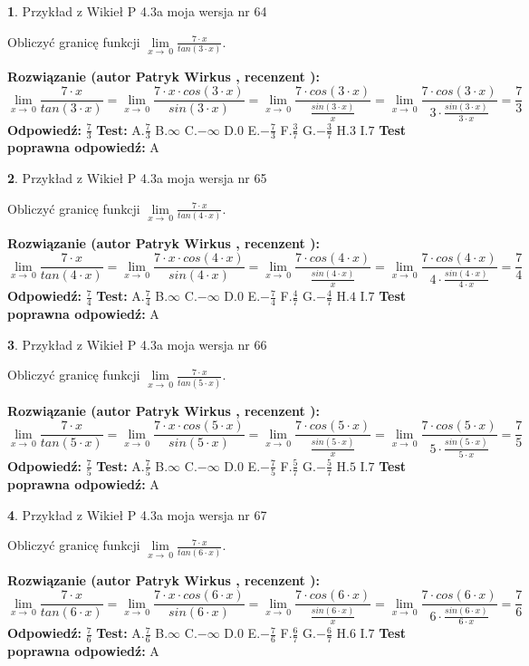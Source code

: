 \documentclass[12pt, a4paper]{article}
\theoremstyle{definition} %
\newtheorem{zad}{}
\newcommand{\zadStart}[1]{\begin{zad}#1\newline}
\newcommand{\zadStop}{\end{zad}}
\newcommand{\rozwStart}[2]{\noindent \textbf{Rozwiązanie (autor #1 , recenzent #2): }\newline}
\newcommand{\rozwStop}{\newline}
\newcommand{\odpStart}{\noindent \textbf{Odpowiedź:}\newline}
\newcommand{\odpStop}{\newline}
\newcommand{\testStart}{\noindent \textbf{Test:}\newline}
\newcommand{\testStop}{\newline}
\newcommand{\kluczStart}{\noindent \textbf{Test poprawna odpowiedź:}\newline}
\newcommand{\kluczStop}{\newline}
\begin{document}
\zadStart{Przykład z Wikieł P 4.3a moja wersja nr 64}


Obliczyć granicę funkcji $\lim\limits_{x\to\ 0}\frac{7 \cdot x}{tan(3 \cdot x)}$.
\zadStop
\rozwStart{Patryk Wirkus}{}
$$\lim\limits_{x\to\ 0}\frac{7 \cdot x}{tan(3 \cdot x)}=\lim\limits_{x\to\ 0}\frac{7 \cdot x \cdot cos(3 \cdot x)}{sin(3 \cdot x)}=\lim\limits_{x\to\ 0}\frac{7 \cdot cos(3 \cdot x)}{\frac{sin(3 \cdot x)}{x}}=\lim\limits_{x\to\ 0}\frac{7 \cdot cos(3 \cdot x)}{3 \cdot \frac{sin(3 \cdot x)}{3 \cdot x}} = \frac{7}{3}$$
\rozwStop
\odpStart
$\frac{7}{3}$
\odpStop
\testStart
A.$\frac{7}{3}$
B.$\infty$
C.$-\infty$
D.$0$
E.$-\frac{7}{3}$
F.$\frac{3}{7}$
G.$-\frac{3}{7}$
H.$3$
I.$7$
\testStop
\kluczStart
A
\kluczStop



\zadStart{Przykład z Wikieł P 4.3a moja wersja nr 65}


Obliczyć granicę funkcji $\lim\limits_{x\to\ 0}\frac{7 \cdot x}{tan(4 \cdot x)}$.
\zadStop
\rozwStart{Patryk Wirkus}{}
$$\lim\limits_{x\to\ 0}\frac{7 \cdot x}{tan(4 \cdot x)}=\lim\limits_{x\to\ 0}\frac{7 \cdot x \cdot cos(4 \cdot x)}{sin(4 \cdot x)}=\lim\limits_{x\to\ 0}\frac{7 \cdot cos(4 \cdot x)}{\frac{sin(4 \cdot x)}{x}}=\lim\limits_{x\to\ 0}\frac{7 \cdot cos(4 \cdot x)}{4 \cdot \frac{sin(4 \cdot x)}{4 \cdot x}} = \frac{7}{4}$$
\rozwStop
\odpStart
$\frac{7}{4}$
\odpStop
\testStart
A.$\frac{7}{4}$
B.$\infty$
C.$-\infty$
D.$0$
E.$-\frac{7}{4}$
F.$\frac{4}{7}$
G.$-\frac{4}{7}$
H.$4$
I.$7$
\testStop
\kluczStart
A
\kluczStop



\zadStart{Przykład z Wikieł P 4.3a moja wersja nr 66}


Obliczyć granicę funkcji $\lim\limits_{x\to\ 0}\frac{7 \cdot x}{tan(5 \cdot x)}$.
\zadStop
\rozwStart{Patryk Wirkus}{}
$$\lim\limits_{x\to\ 0}\frac{7 \cdot x}{tan(5 \cdot x)}=\lim\limits_{x\to\ 0}\frac{7 \cdot x \cdot cos(5 \cdot x)}{sin(5 \cdot x)}=\lim\limits_{x\to\ 0}\frac{7 \cdot cos(5 \cdot x)}{\frac{sin(5 \cdot x)}{x}}=\lim\limits_{x\to\ 0}\frac{7 \cdot cos(5 \cdot x)}{5 \cdot \frac{sin(5 \cdot x)}{5 \cdot x}} = \frac{7}{5}$$
\rozwStop
\odpStart
$\frac{7}{5}$
\odpStop
\testStart
A.$\frac{7}{5}$
B.$\infty$
C.$-\infty$
D.$0$
E.$-\frac{7}{5}$
F.$\frac{5}{7}$
G.$-\frac{5}{7}$
H.$5$
I.$7$
\testStop
\kluczStart
A
\kluczStop



\zadStart{Przykład z Wikieł P 4.3a moja wersja nr 67}


Obliczyć granicę funkcji $\lim\limits_{x\to\ 0}\frac{7 \cdot x}{tan(6 \cdot x)}$.
\zadStop
\rozwStart{Patryk Wirkus}{}
$$\lim\limits_{x\to\ 0}\frac{7 \cdot x}{tan(6 \cdot x)}=\lim\limits_{x\to\ 0}\frac{7 \cdot x \cdot cos(6 \cdot x)}{sin(6 \cdot x)}=\lim\limits_{x\to\ 0}\frac{7 \cdot cos(6 \cdot x)}{\frac{sin(6 \cdot x)}{x}}=\lim\limits_{x\to\ 0}\frac{7 \cdot cos(6 \cdot x)}{6 \cdot \frac{sin(6 \cdot x)}{6 \cdot x}} = \frac{7}{6}$$
\rozwStop
\odpStart
$\frac{7}{6}$
\odpStop
\testStart
A.$\frac{7}{6}$
B.$\infty$
C.$-\infty$
D.$0$
E.$-\frac{7}{6}$
F.$\frac{6}{7}$
G.$-\frac{6}{7}$
H.$6$
I.$7$
\testStop
\kluczStart
A
\kluczStop
\end{document}
